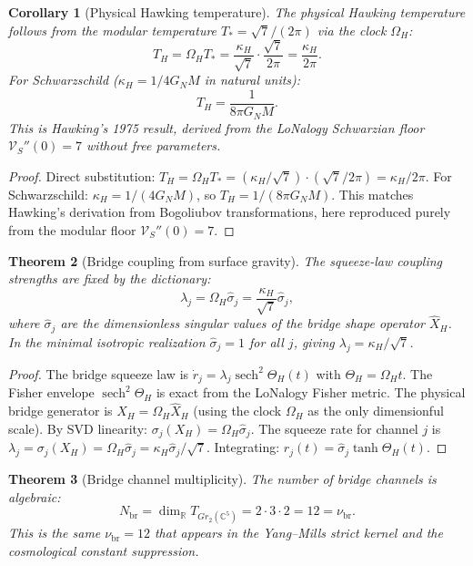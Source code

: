 \documentclass[12pt]{article}
\theoremstyle{plain}
\newtheorem{theorem}{Theorem}[section]
\newtheorem{corollary}[theorem]{Corollary}
\theoremstyle{definition}
\numberwithin{equation}{section}
\newcommand{\R}{\mathbb{R}}
\newcommand{\C}{\mathbb{C}}
\newcommand{\br}{\mathrm{br}}
\DeclareMathOperator{\sech}{sech}
\begin{document}
\begin{corollary}[Physical Hawking temperature]\label{cor:TH}
The physical Hawking temperature follows from the modular temperature $T_* = \sqrt{7}/(2\pi)$ via the clock $\Omega_H$:
\[
\boxed{T_H = \Omega_H T_* = \frac{\kappa_H}{\sqrt{7}}\cdot\frac{\sqrt{7}}{2\pi} = \frac{\kappa_H}{2\pi}.}
\]
For Schwarzschild ($\kappa_H = 1/4G_N M$ in natural units):
\[
T_H = \frac{1}{8\pi G_N M}.
\]
This is Hawking's 1975 result, derived from the LoNalogy Schwarzian floor $\mathcal{V}_S''(0)=7$ without free parameters.
\end{corollary}

\begin{proof}
Direct substitution: $T_H=\Omega_H T_*=(\kappa_H/\sqrt{7})\cdot(\sqrt{7}/2\pi)=\kappa_H/2\pi$.
For Schwarzschild: $\kappa_H=1/(4G_NM)$, so $T_H=1/(8\pi G_NM)$.
This matches Hawking's derivation from Bogoliubov transformations, here reproduced purely from the modular floor $\mathcal{V}_S''(0)=7$.
\end{proof}

\begin{theorem}[Bridge coupling from surface gravity]\label{thm:BHlambda}
The squeeze-law coupling strengths are fixed by the dictionary:
\[
\boxed{\lambda_j = \Omega_H\hat{\sigma}_j = \frac{\kappa_H}{\sqrt{7}}\hat{\sigma}_j,}
\]
where $\hat{\sigma}_j$ are the dimensionless singular values of the bridge shape operator $\widehat{X}_H$.  In the minimal isotropic realization $\hat{\sigma}_j = 1$ for all $j$, giving $\lambda_j = \kappa_H/\sqrt{7}$.
\end{theorem}

\begin{proof}
The bridge squeeze law is $\dot{r}_j=\lambda_j\sech^2\Theta_H(t)$ with $\Theta_H=\Omega_H t$.
The Fisher envelope $\sech^2\Theta_H$ is exact from the LoNalogy Fisher metric.
The physical bridge generator is $X_H=\Omega_H\widehat{X}_H$ (using the clock $\Omega_H$ as the only dimensionful scale).
By SVD linearity: $\sigma_j(X_H)=\Omega_H\hat{\sigma}_j$.
The squeeze rate for channel $j$ is $\lambda_j=\sigma_j(X_H)=\Omega_H\hat{\sigma}_j=\kappa_H\hat{\sigma}_j/\sqrt{7}$.
Integrating: $r_j(t)=\hat{\sigma}_j\tanh\Theta_H(t)$.
\end{proof}

\begin{theorem}[Bridge channel multiplicity]\label{thm:BHNbr}
The number of bridge channels is algebraic:
\[
N_\br = \dim_\R T_{Gr_2(\C^5)} = 2\cdot 3\cdot 2 = 12 = \nu_\br.
\]
This is the same $\nu_\br = 12$ that appears in the Yang--Mills strict kernel and the cosmological constant suppression.
\end{theorem}
\end{document}
